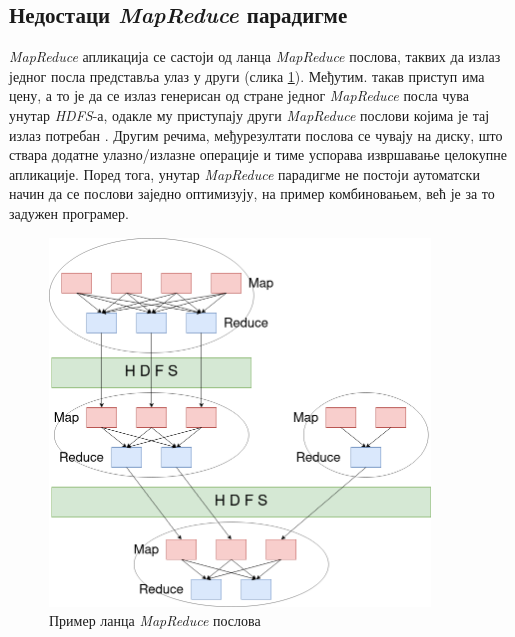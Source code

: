 \documentclass[12pt,oneside]{memoir}
\begin{document}

\subsection{Недостаци \textit{MapReduce} парадигме}
\label{subsec:nedost_mr}

\textit{MapReduce} апликација се састоји од ланца \textit{MapReduce} послова, таквих да излаз једног посла представља улаз у други (слика \ref{fig:mr_app_example}). Међутим. такав приступ има цену, а то је да се излаз генерисан од стране једног \textit{MapReduce} посла чува унутар \textit{HDFS}-а, одакле му приступају други \textit{MapReduce} послови којима је тај излаз потребан \cite{hadoop_learning}. Другим речима, међурезултати послова се чувају на диску, што ствара додатне улазно/излазне операције и тиме успорава извршавање целокупне апликације. Поред тога, унутар \textit{MapReduce} парадигме не постоји аутоматски начин да се послови заједно оптимизују, на пример комбиновањем, већ је за то задужен програмер.

\begin{figure}[!ht]
  \centering
  \includegraphics[width=0.9\textwidth]{pictures/mr_app.png}
  \caption{Пример ланца \textit{MapReduce} послова}
  \label{fig:mr_app_example}
\end{figure}
\end{document}
